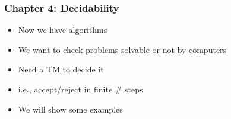 




\begin{frame}[allowframebreaks] \frametitle{Chapter 4: Decidability}
  \begin{itemize}
\item Now we have algorithms
\item We want to check problems solvable or not by computers

\item Need a TM to decide it

\item [] i.e., accept/reject in finite \# steps

\item We will show some examples
  
\end{itemize}\end{frame}

